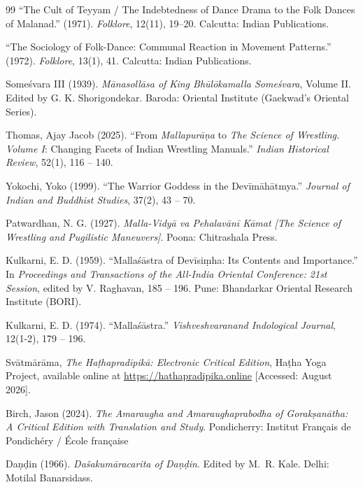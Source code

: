 \documentclass[11pt,twoside,letterpaper]{article}
\begin{document}
\begin{thebibliography}{99}
``The Cult of Teyyam / The Indebtedness of Dance Drama to the Folk Dances of Malanad.'' (1971). \textit{Folklore}, 12(11), 19--20. Calcutta: Indian Publications.

``The Sociology of Folk-Dance: Communal Reaction in Movement Patterns.'' (1972). \textit{Folklore}, 13(1), 41. Calcutta: Indian Publications.

Someśvara III (1939). \textit{Mānasollāsa of King Bhūlōkamalla Someśvara}, Volume II. Edited by G. K. Shorigondekar. Baroda: Oriental Institute (Gaekwad's Oriental Series).

Thomas, Ajay Jacob (2025). ``From \textit{Mallapurāṇa} to \textit{The Science of Wrestling. Volume I}: Changing Facets of Indian Wrestling Manuals.'' \textit{Indian Historical Review}, 52(1), 116 -- 140.

Yokochi, Yoko (1999). ``The Warrior Goddess in the Devīmāhātmya.'' \textit{Journal of Indian and Buddhist Studies}, 37(2), 43 -- 70.

Patwardhan, N. G. (1927). \textit{Malla-Vidyā va Pehalavānī Kāmat [The Science of Wrestling and Pugilistic Maneuvers]}. Poona: Chitrashala Press.

Kulkarni, E. D. (1959). ``Mallaśāstra of Devīsiṃha: Its Contents and Importance.'' In \textit{Proceedings and Transactions of the All-India Oriental Conference: 21st Session}, edited by V. Raghavan, 185 -- 196. Pune: Bhandarkar Oriental Research Institute (BORI).

Kulkarni, E. D. (1974). ``Mallaśāstra.'' \textit{Vishveshvaranand Indological Journal}, 12(1-2), 179 -- 196.

Svātmārāma, \textit{The Haṭhapradīpikā: Electronic Critical Edition}, Haṭha Yoga Project, available online at \url{https://hathapradipika.online} [Accessed: August 2026].

Birch, Jason (2024). \textit{The Amaraugha and Amaraughaprabodha of Gorakṣanātha: A Critical Edition with Translation and Study}. Pondicherry: Institut Français de Pondichéry / École française

Daṇḍin (1966).
\newblock \emph{Da\v{s}akumāracarita of Daṇḍin}.
\newblock Edited by M.~R. Kale. Delhi: Motilal Banarsidass.


\end{thebibliography}
\end{document}
